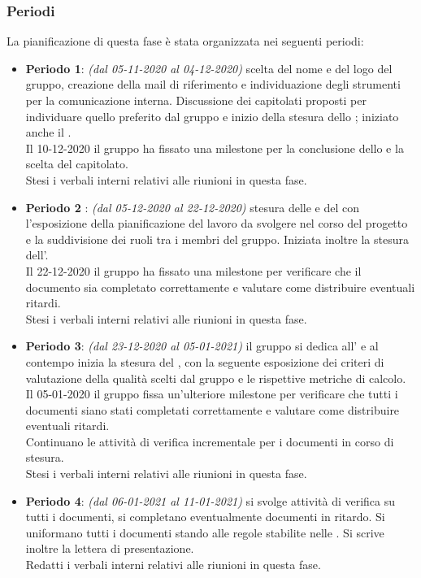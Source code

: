 \subsubsection{Periodi}
La pianificazione di questa fase è stata organizzata nei seguenti periodi:
\begin{itemize}
\item \textbf{Periodo 1}: \textit{(dal 05-11-2020 al 04-12-2020)} scelta del nome e del logo del gruppo, creazione della mail di riferimento e individuazione degli strumenti per la comunicazione interna. Discussione dei capitolati proposti per individuare quello preferito dal gruppo e inizio della stesura dello \SdF{}; iniziato anche il \Glossario. \\Il 10-12-2020 il gruppo ha fissato una milestone\glo{} per la conclusione dello \SdF{} e la scelta del capitolato.\\Stesi i verbali interni relativi alle riunioni in questa fase.
\item \textbf{Periodo 2 }: \textit{(dal 05-12-2020 al 22-12-2020)} stesura delle \NdP{} e del \PdP{} con l'esposizione della pianificazione del lavoro da svolgere nel corso del progetto e la suddivisione dei ruoli tra i membri del gruppo. Iniziata inoltre la stesura dell'\AdR{}.\\Il 22-12-2020 il gruppo ha fissato una milestone\glo{} per verificare che il documento \NdP{} sia completato correttamente e valutare come distribuire eventuali ritardi.\\Stesi i verbali interni relativi alle riunioni in questa fase.
\item \textbf{Periodo 3}: \textit{(dal 23-12-2020 al 05-01-2021)} il gruppo si dedica all'\AdR{} e al contempo inizia la stesura del \PdQ{}, con la seguente esposizione dei criteri di valutazione della qualità scelti dal gruppo e le rispettive metriche\glo{} di calcolo.\\Il 05-01-2020 il gruppo fissa un'ulteriore milestone\glo{} per verificare che tutti i documenti siano stati completati correttamente e valutare come distribuire eventuali ritardi.\\Continuano le attività di verifica incrementale per i documenti in corso di stesura.\\Stesi i verbali interni relativi alle riunioni in questa fase.
\item \textbf{Periodo 4}: \textit{(dal 06-01-2021 al 11-01-2021)} si svolge attività di verifica su tutti i documenti, si completano eventualmente documenti in ritardo. Si uniformano tutti i documenti stando alle regole stabilite nelle \NdP{}. Si scrive inoltre la lettera di presentazione.\\Redatti i verbali interni relativi alle riunioni in questa fase.
\end{itemize}

